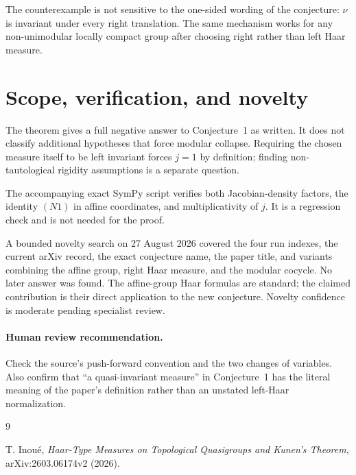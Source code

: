 \documentclass[11pt]{article}
\begin{document}
The counterexample is not sensitive to the one-sided wording of the
conjecture: $\nu$ is invariant under every right translation.  The same
mechanism works for any non-unimodular locally compact group after choosing
right rather than left Haar measure.

\section{Scope, verification, and novelty}

The theorem gives a full negative answer to Conjecture~1 as written.  It does
not classify additional hypotheses that force modular collapse.  Requiring
the chosen measure itself to be left invariant forces $j=1$ by definition;
finding non-tautological rigidity assumptions is a separate question.

The accompanying exact SymPy script verifies both Jacobian-density factors,
the identity $(N1)$ in affine coordinates, and multiplicativity of $j$.  It is
a regression check and is not needed for the proof.

A bounded novelty search on 27 August 2026 covered the four run indexes, the
current arXiv record, the exact conjecture name, the paper title, and variants
combining the affine group, right Haar measure, and the modular cocycle.  No
later answer was found.  The affine-group Haar formulas are standard; the
claimed contribution is their direct application to the new conjecture.
Novelty confidence is moderate pending specialist review.

\paragraph{Human review recommendation.}
Check the source's push-forward convention and the two changes of variables.
Also confirm that “a quasi-invariant measure” in Conjecture~1 has the literal
meaning of the paper's definition rather than an unstated left-Haar
normalization.

\begin{thebibliography}{9}
\raggedright
{}
T. Inou\'e,
\emph{Haar-Type Measures on Topological Quasigroups and Kunen's Theorem},
arXiv:2603.06174v2 (2026).
\end{thebibliography}
\end{document}
